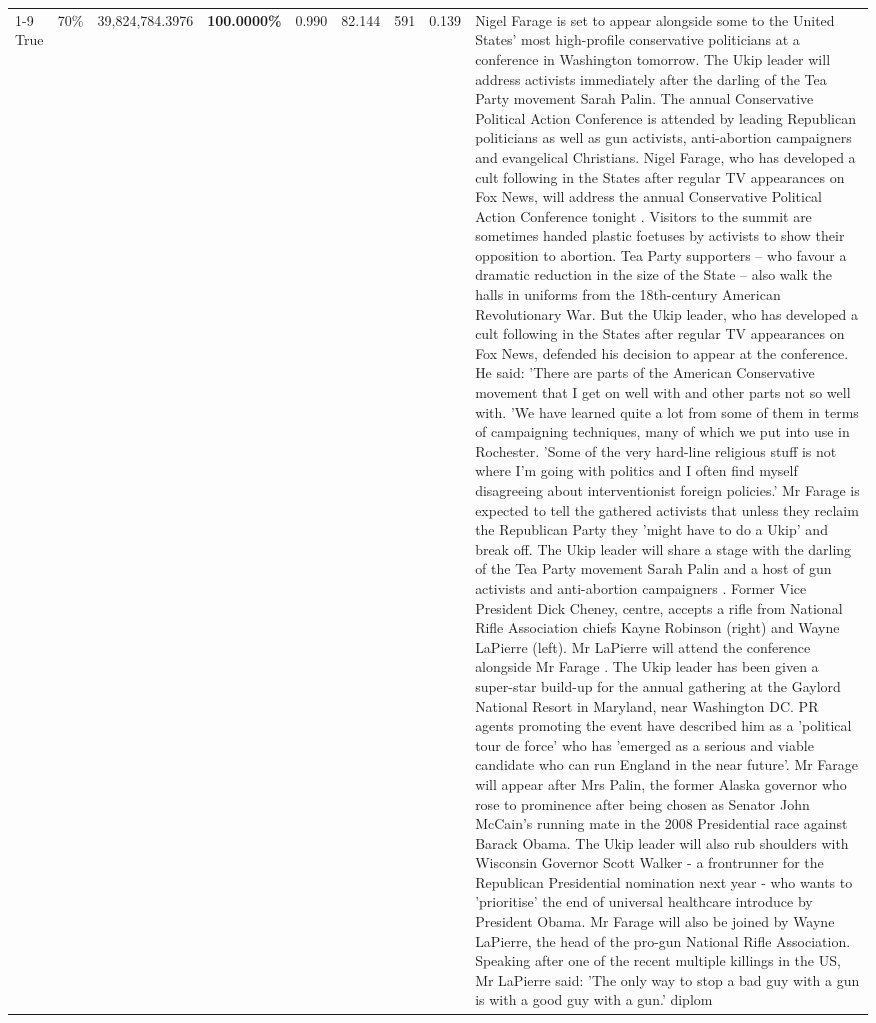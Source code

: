\begin{table}[H]
\begin{tabular}{lllrlllll}
\cline{1-9} \cline{2-9}
True & 70\% & 39,824,784.3976 & \bfseries \color{red} 100.0000\% & 0.990 & 82.144 & 591 & 0.139 & Nigel Farage is set to appear alongside some to the United States' most high-profile conservative politicians at a conference in Washington tomorrow. The Ukip leader will address activists immediately after the darling of the Tea Party movement Sarah Palin. The annual Conservative Political Action Conference is attended by leading Republican politicians as well as gun activists, anti-abortion campaigners and evangelical Christians. Nigel Farage, who has developed a cult following in the States after regular TV appearances on Fox News, will address the annual Conservative Political Action Conference tonight . Visitors to the summit are sometimes handed plastic foetuses by activists to show their opposition to abortion. Tea Party supporters – who favour a dramatic reduction in the size of the State – also walk the halls in uniforms from the 18th-century American Revolutionary War. But the Ukip leader, who has developed a cult following in the States after regular TV appearances on Fox News, defended his decision to appear at the conference. He said: 'There are parts of the American Conservative movement that I get on well with and other parts not so well with. 'We have learned quite a lot from some of them in terms of campaigning techniques, many of which we put into use in Rochester. 'Some of the very hard-line religious stuff is not where I'm going with politics and I often find myself disagreeing about interventionist foreign policies.' Mr Farage is expected to tell the gathered activists that unless they reclaim the Republican Party they 'might have to do a Ukip' and break off. The Ukip leader will share a stage with the darling of the Tea Party movement Sarah Palin and a host of gun activists and anti-abortion campaigners . Former Vice President Dick Cheney, centre, accepts a rifle from National Rifle Association chiefs Kayne Robinson (right) and Wayne LaPierre (left). Mr LaPierre will attend the conference alongside Mr Farage . The Ukip leader has been given a super-star build-up for the annual gathering at the Gaylord National Resort in Maryland, near Washington DC. PR agents promoting the event have described him as a 'political tour de force' who has 'emerged as a serious and viable candidate who can run England in the near future'. Mr Farage will appear after Mrs Palin, the former Alaska governor who rose to prominence after being chosen as Senator John McCain's running mate in the 2008 Presidential race against Barack Obama. The Ukip leader will also rub shoulders with Wisconsin Governor Scott Walker - a frontrunner for the Republican Presidential nomination next year - who wants to 'prioritise' the end of universal healthcare introduce by President Obama. Mr Farage will also be joined by Wayne LaPierre, the head of the pro-gun National Rifle Association. Speaking after one of the recent multiple killings in the US, Mr LaPierre said: 'The only way to stop a bad guy with a gun is with a good guy with a gun.' diplom \\

\end{tabular}
\end{table}
